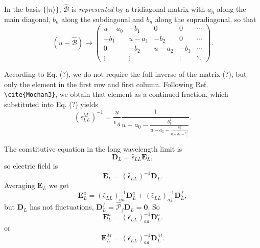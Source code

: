 \documentclass[preprint,12pt]{revtex4}
\newcommand{\op}[1]{{\hat{\mathcal#1}}}
\begin{document}
In the basis $\{|n\rangle\}$, $\op B$ is {\em represented} by a
tridiagonal matrix with $a_n$ along the main diagonal, $b_n$ along the
subdiagonal and $b_n$ along the supradiagonal, so that
\begin{equation}
\label{MWaveMatrix}
\left( u-\op B \right)\to \left(
\begin{array}{ccccc}
 u-a_0 & -b_1 & 0  & 0&\cdots\\
 -b_1 & u-a_1 & -b_2& 0& \cdots\\
 0   & -b_2 & u-a_2 & -b_3& \cdots\\
\vdots&\vdots&     &\vdots &\ddots
\end{array}
\right). 
\end{equation}



According to Eq. (?), we do not require the full
inverse of the matrix (?), but only the element in the
first row and first column. Following Ref. \verb=\cite{Mochan3}=, we obtain
that element as a continued fraction, which substituted into
Eq. (?) yields
\begin{equation}\label{chin}
  \left( \epsilon^{M}_{LL}\right)^{-1} = \frac{u}{\epsilon_A} \frac{1} {u-a_0 -\frac{
      b_1^2} {u -a_1 -\frac{b_2^2} {u- a_2 -\frac{b_3^2}{\ddots }}}}.
\end{equation}



The constitutive equation in the long wavelength limit is
\begin{equation}
\label{constitutiva}
  \mathbf D_{L} = \hat \epsilon_{LL} \mathbf E_L,
\end{equation}
so electric field is
\begin{equation}\label{EL}
  \mathbf E_L = (\hat\epsilon_{LL})^{-1}\mathbf D_L.
\end{equation}
Averaging  $\mathbf E_L $ we get
\begin{equation}\label{ELp}
  \mathbf E_L^a = (\hat\epsilon_{LL})_{aa}^{-1}\mathbf D_L^a +
  (\hat\epsilon_{LL})_{af}^{-1}\mathbf D_L^f,
\end{equation}
but $\mathbf D_L$ has not fluctuations, $\mathbf D_L^f=
\hat{\mathcal{P}}_{f} \mathbf D_L=\mathbf 0$. So
\begin{equation}\label{ELM}
  \mathbf E_L^a = (\hat\epsilon_{LL})_{aa}^{-1}\mathbf D_L^a.
\end{equation}
or
\begin{equation}\label{ELMm}
  \mathbf E_L^M = (\hat\epsilon_{LL})_{aa}^{-1}\mathbf D_L^M.
\end{equation}
\end{document}
